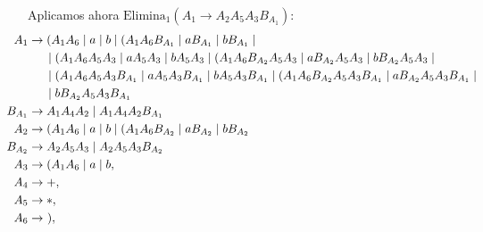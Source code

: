 \documentclass[12pt]{article}
\begin{document}
\begin{ejercicio}[2.5 puntos]
\begin{description}
        Aplicamos ahora $\text{Elimina}_1(A_1\rightarrow A_2 A_5 A_3 B_{A_1})$:
        \begin{align*}
            \hspace{-2.5cm}A_1 &\to (A_1 A_6 \mid a \mid b\mid (A_1 A_6 B_{A_1} \mid a B_{A_1} \mid b B_{A_1}
                \mid \\ & \hspace{0.5cm} \mid (A_1 A_6A_5A_3 \mid aA_5A_3 \mid bA_5A_3 \mid (A_1 A_6 B_{A_2}A_5A_3 \mid  a B_{A_2}A_5A_3 \mid  b B_{A_2}A_5A_3
                \mid \\ & \hspace{0.5cm} \mid (A_1 A_6 A_5 A_3 B_{A_1} \mid aA_5 A_3 B_{A_1} \mid bA_5 A_3 B_{A_1} \mid (A_1 A_6 B_{A_2}A_5 A_3 B_{A_1} \mid  a B_{A_2}A_5 A_3 B_{A_1}
                \mid \\ & \hspace{0.5cm} \mid  b B_{A_2}A_5 A_3 B_{A_1} \\
            \hspace{-2.5cm}B_{A_1} &\to A_1 A_4 A_2 \mid A_1 A_4 A_2 B_{A_1} \\
            \hspace{-2.5cm}A_2 &\to (A_1 A_6 \mid a \mid b \mid (A_1 A_6 B_{A_2} \mid  a B_{A_2} \mid  b B_{A_2} \\
            \hspace{-2.5cm}B_{A_2} & \to A_2 A_5 A_3 \mid A_2 A_5 A_3 B_{A_2}\\
            \hspace{-2.5cm}A_3 &\to (A_1 A_6 \mid a \mid b,\\
            \hspace{-2.5cm}A_4 &\to +,\\
            \hspace{-2.5cm}A_5 &\to *,\\
            \hspace{-2.5cm}A_6 &\to~),
        \end{align*}


\end{description}
\end{ejercicio}
\end{document}
